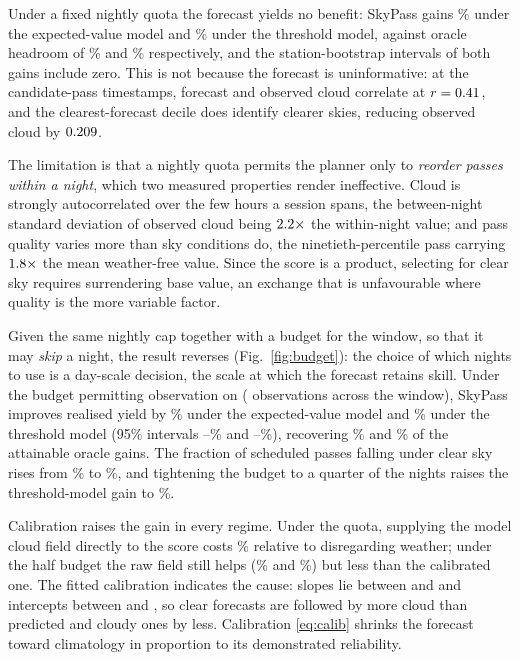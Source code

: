 \documentclass[conference]{IEEEtran}
\begin{document}
Under a fixed nightly quota the forecast yields no benefit: SkyPass gains
\QuotaGainEV\% under the expected-value model and \QuotaGainClear\% under the
threshold model, against oracle headroom of \QuotaOracleEV\% and
\QuotaOracleClear\% respectively, and the station-bootstrap intervals of both
gains include zero. This is not because the forecast is
uninformative: at the candidate-pass timestamps, forecast and observed cloud
correlate at $r = 0.41$, and the clearest-forecast decile does identify
clearer skies, reducing observed cloud by $0.209$.

The limitation is that a nightly quota permits the planner only to
\emph{reorder passes within a night}, which two measured properties render
ineffective. Cloud is strongly autocorrelated over the few hours a session
spans, the between-night standard deviation of observed cloud being
$2.2\times$ the within-night value; and pass quality varies more than
sky conditions do, the ninetieth-percentile pass carrying $1.8\times$ the
mean weather-free value. Since the score is a product, selecting for clear sky
requires surrendering base value, an exchange that is unfavourable where quality
is the more variable factor.

Given the same nightly cap together with a budget for the window, so that it may
\emph{skip} a night, the result reverses (Fig.~\ref{fig:budget}): the choice of
which nights to use is a day-scale decision, the scale at which the forecast
retains skill. Under the budget permitting observation on \BestBudgetMode{}
(\BudgetTotal{} observations across the window), SkyPass improves realised yield
by \BudgetGainEV\% under the expected-value model and \BudgetGainClear\% under
the threshold model (95\% intervals \BudgetGainEVLo--\BudgetGainEVHi\% and
\BudgetGainClearLo--\BudgetGainClearHi\%), recovering \BudgetRecoveredEV\% and
\BudgetRecoveredClear\% of the attainable oracle gains. The fraction of
scheduled passes falling under clear sky rises from \BudgetBlindClearRate\% to
\BudgetClearRate\%, and tightening the budget to a quarter of the nights raises
the threshold-model gain to \TightGainClear\%.

Calibration raises the gain in every regime. Under the quota,
supplying the model cloud field directly to the score costs \QuotaRawEV\%
relative to disregarding weather; under the half budget the raw field still
helps (\RawBudgetEV\% and \RawBudgetClear\%) but less than the calibrated one.
The fitted calibration indicates the cause: slopes lie between \SlopeMin{}
and \SlopeMax{} and intercepts between \InterceptMin{} and \InterceptMax{}, so
clear forecasts are followed by more cloud than predicted and cloudy ones by
less. Calibration \eqref{eq:calib} shrinks the forecast toward climatology in
proportion to its demonstrated reliability.
\end{document}
